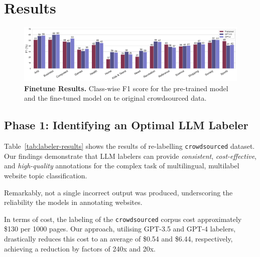 \section{Results}

\begin{figure}[h]
    \centering
    \includegraphics[width=\textwidth]{./figures/exp2-mf1.pdf}
    \caption{\textbf{Finetune Results.} Class-wise F1 score for the pre-trained model and the fine-tuned model on te original crowdsourced data.}
    \label{fig:finetune-results}
\end{figure}


\subsection*{Phase 1: Identifying an Optimal LLM Labeler}

Table~\ref{tab:labeler-results} shows the results of re-labelling \texttt{crowdsourced} dataset. Our findings demonstrate that LLM labelers can provide \textit{consistent}, \textit{cost-effective}, and \textit{high-quality} annotations for the complex task of multilingual, multilabel website topic classification. 

Remarkably, not a single incorrect output was produced, underscoring the reliability the models in annotating websites.


In terms of cost, the labeling of the \texttt{crowdsourced} corpus cost approximately \$130 per 1000 pages. Our approach, utilising GPT-3.5 and GPT-4 labelers, drastically reduces this cost to an average of \$0.54 and \$6.44, respectively, achieving a reduction by factors of 240x and 20x.





